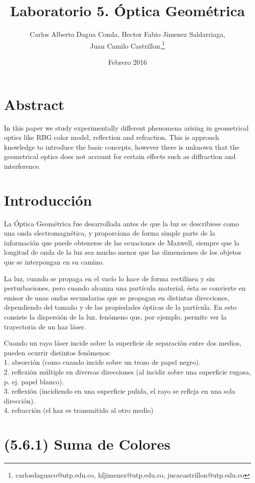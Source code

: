\documentclass{article}
\title{Laboratorio 5. Óptica Geométrica}
\author{Carlos Alberto Dagua Conda, Hector Fabio Jimenez Saldarriaga, \\Juan Camilo Castrillon,\thanks{carlosdaguaco@utp.edu.co, hfjimenez@utp.edu.co, jucacastrillon@utp.edu.co} }
\date{Febrero 2016}
\begin{document}
\maketitle

\section{Abstract}

In this paper we study experimentally different phenomena arising in geometrical optics like RBG color model, reflection and refraction. This is approach knowledge to introduce the basic concepts, however there is unknown that the geometrical optics does not account for certain effects such as diffraction and interference.


\section{Introducción}


La Óptica Geométrica fue desarrollada antes de que la luz se describiese como una onda electromagnética, y proporciona de forma simple parte de la información que puede obtenerse de las ecuaciones de Maxwell, siempre que la longitud de onda de la luz sea mucho menor que las dimensiones de los objetos que se interpongan en su camino.

La luz, cuando se propaga en el vacío lo hace de forma rectilínea y sin perturbaciones, pero cuando alcanza una partícula material, ésta se convierte en emisor de unas ondas secundarias que se propagan en distintas direcciones, dependiendo del tamaño y de las propiedades ópticas de la partícula. En esto consiste la dispersión de la luz, fenómeno que, por ejemplo, permite ver la trayectoria de un haz láser.

Cuando un rayo láser incide sobre la superficie de separación entre dos medios, pueden ocurrir distintos fenómenos:\\

1.  absorción (como cuando incide sobre un trozo de papel negro).\\ 
2.  reflexión múltiple en diversas direcciones (al incidir sobre una superficie rugosa, p. ej. papel blanco).\\
3. reflexión (incidiendo en una superficie pulida, el rayo se refleja en una sola dirección).\\
4. refracción (el haz es transmitido al otro medio)


\section{(5.6.1) Suma de Colores}
\end{document}

